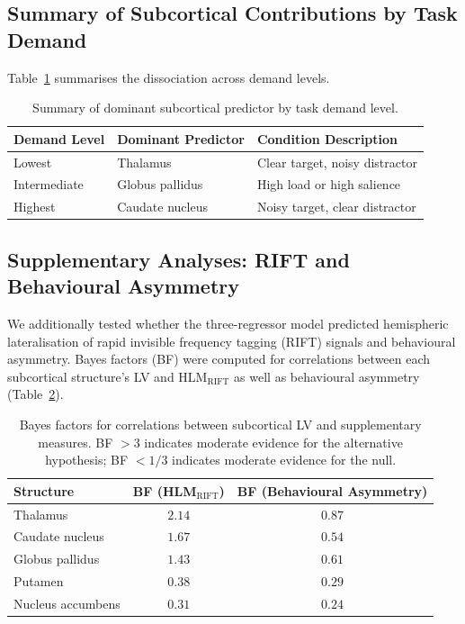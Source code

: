 \documentclass[11pt]{article}
\begin{document}
\subsection{Summary of Subcortical Contributions by Task Demand}

Table~\ref{tab:demand_summary} summarises the dissociation across demand levels.

\begin{table}[H]
\centering
\caption{Summary of dominant subcortical predictor by task demand level.}
\label{tab:demand_summary}
\begin{tabular}{@{}lll@{}}
\toprule
Demand Level & Dominant Predictor & Condition Description \\
\midrule
Lowest & Thalamus & Clear target, noisy distractor \\
Intermediate & Globus pallidus & High load or high salience \\
Highest & Caudate nucleus & Noisy target, clear distractor \\
\bottomrule
\end{tabular}
\end{table}

\subsection{Supplementary Analyses: RIFT and Behavioural Asymmetry}

We additionally tested whether the three-regressor model predicted hemispheric lateralisation of rapid invisible frequency tagging (RIFT) signals and behavioural asymmetry. Bayes factors (BF) were computed for correlations between each subcortical structure's LV and HLM$_\text{RIFT}$ as well as behavioural asymmetry (Table~\ref{tab:bayes}).

\begin{table}[H]
\centering
\caption{Bayes factors for correlations between subcortical LV and supplementary measures. BF $> 3$ indicates moderate evidence for the alternative hypothesis; BF $< 1/3$ indicates moderate evidence for the null.}
\label{tab:bayes}
\begin{tabular}{@{}lcc@{}}
\toprule
Structure & BF (HLM$_\text{RIFT}$) & BF (Behavioural Asymmetry) \\
\midrule
Thalamus & $2.14$ & $0.87$ \\
Caudate nucleus & $1.67$ & $0.54$ \\
Globus pallidus & $1.43$ & $0.61$ \\
Putamen & $0.38$ & $0.29$ \\
Nucleus accumbens & $0.31$ & $0.24$ \\
\bottomrule
\end{tabular}
\end{table}
\end{document}
